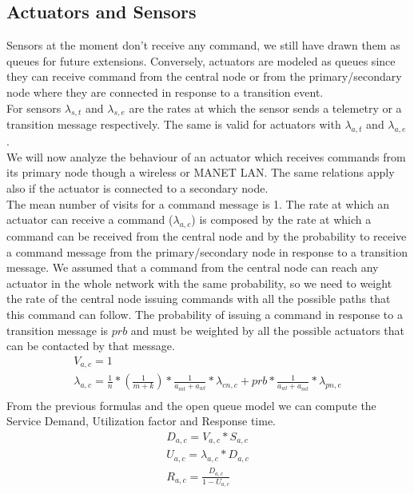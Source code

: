 \documentclass[11pt]{article}
\begin{document}
\subsection{Actuators and Sensors}
Sensors at the moment don't receive any command, we still have drawn them as queues for future extensions. Conversely, actuators are modeled as queues since they can receive command from the central node or from the primary/secondary node where they are connected in response to a transition event.\\
For sensors $\lambda_{s,t}$ and $\lambda_{s,e}$ are the rates at which the sensor sends a telemetry or a transition message respectively. The same is valid for actuators with $\lambda_{a,t}$ and $\lambda_{a,e}$.\\
We will now analyze the behaviour of an actuator which receives commands from its primary node though a wireless or MANET LAN. The same relations apply also if the actuator is connected to a secondary node.\\
The mean number of visits for a command message is 1.
The rate at which an actuator can receive a command ($\lambda_{a,c}$) is composed by the rate at which a command can be received from the central node and by the probability to receive a command message from the primary/secondary node in response to a transition message. We assumed that a command from the central node can reach any actuator in the whole network with the same probability, so we need to weight the rate of the central node issuing commands with all the possible paths that this command can follow. The probability of issuing a command in response to a transition message is $prb$ and must be weighted by all the possible actuators that can be contacted by that message.
\begin{equation}
	\begin{array}{l}
		V_{a,c} = 1 \\
		\lambda_{a, c} = \frac{1}{n} * (\frac{1}{m+k}) * \frac{1}{a_{mt}+a_{wl}} * \lambda_{cn, c} + prb * \frac{1}{a_{wl}+a_{mt}} * \lambda_{pn,e}   \\
	\end{array}
\end{equation}
From the previous formulas and the open queue model we can compute the Service Demand, Utilization factor and Response time.
\begin{equation}
	\begin{array}{l}
		D_{a, c} = V_{a, c} * S_{a, c} \\
		U_{a, c} = \lambda_{a, c} * D_{a, c} \\
		R_{a, c} = \frac{D_{a, c}}{1 - U_{a,c}} \\
	\end{array}
\end{equation}
\end{document}
